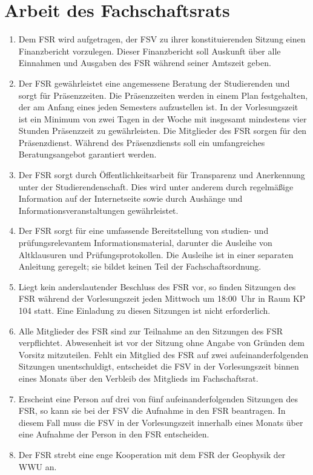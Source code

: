 \section{Arbeit des Fachschaftsrats}
\begin{enumerate}
	\item Dem FSR wird aufgetragen, der FSV zu ihrer konstituierenden Sitzung einen Finanzbericht vorzulegen.
	Dieser Finanzbericht soll Auskunft über alle Einnahmen und Ausgaben des FSR während seiner Amtszeit geben.
	\item Der FSR gewährleistet eine angemessene Beratung der Studierenden und sorgt für Präsenzzeiten.
	Die Präsenzzeiten werden in einem Plan festgehalten, der am Anfang eines jeden Semesters aufzustellen ist.
	In der Vorlesungszeit ist ein Minimum von zwei Tagen in der Woche mit insgesamt mindestens vier Stunden Präsenzzeit zu gewährleisten.
	Die Mitglieder des FSR sorgen für den Präsenzdienst.
	Während des Präsenzdiensts soll ein umfangreiches Beratungsangebot garantiert werden.
	\item Der FSR sorgt durch Öffentlichkeitsarbeit für Transparenz und Anerkennung unter der Studierendenschaft.
	Dies wird unter anderem durch regelmäßige Information auf der Internetseite sowie durch Aushänge und Informationsveranstaltungen gewährleistet.
	\item Der FSR sorgt für eine umfassende Bereitstellung von studien- und prüfungsrelevantem Informationsmaterial, darunter die Ausleihe von Altklausuren und Prüfungsprotokollen.
	Die Ausleihe ist in einer separaten Anleitung geregelt; sie bildet keinen Teil der Fachschaftsordnung.
	\item Liegt kein anderslautender Beschluss des FSR vor, so finden Sitzungen des FSR während der Vorlesungszeit jeden Mittwoch um 18:00~Uhr in Raum KP 104 statt.
	Eine Einladung zu diesen Sitzungen ist nicht erforderlich.
	\item Alle Mitglieder des FSR sind zur Teilnahme an den Sitzungen des FSR verpflichtet. Abwesenheit ist vor der Sitzung ohne Angabe von Gründen dem Vorsitz mitzuteilen. Fehlt ein Mitglied des FSR auf zwei aufeinanderfolgenden Sitzungen	unentschuldigt, entscheidet die FSV in der Vorlesungszeit binnen eines Monats über den	Verbleib des Mitglieds im Fachschaftsrat.
	\item Erscheint eine Person auf drei von fünf aufeinanderfolgenden Sitzungen des FSR, so kann sie bei der FSV die Aufnahme in den FSR beantragen. In diesem Fall muss die FSV in der Vorlesungszeit innerhalb eines Monats über eine Aufnahme der	Person in den FSR entscheiden.
	\item Der FSR strebt eine enge Kooperation mit dem FSR der Geophysik der WWU an.
\end{enumerate}

